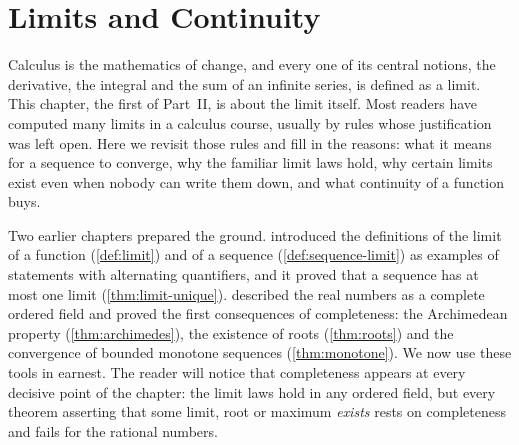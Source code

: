 \chapter{Limits and Continuity}
\label{ch:limits}


Calculus is the mathematics of change, and every one of its central notions, the derivative, the integral and the sum of an infinite series, is defined as a limit. This chapter, the first of Part~II, is about the limit itself. Most readers have computed many limits in a calculus course, usually by rules whose justification was left open. Here we revisit those rules and fill in the reasons: what it means for a sequence to converge, why the familiar limit laws hold, why certain limits exist even when nobody can write them down, and what continuity of a function buys.

Two earlier chapters prepared the ground.  introduced the definitions of the limit of a function (\cref{def:limit}) and of a sequence (\cref{def:sequence-limit}) as examples of statements with alternating quantifiers, and it proved that a sequence has at most one limit (\cref{thm:limit-unique}).  described the real numbers as a complete ordered field and proved the first consequences of completeness: the Archimedean property (\cref{thm:archimedes}), the existence of roots (\cref{thm:roots}) and the convergence of bounded monotone sequences (\cref{thm:monotone}). We now use these tools in earnest. The reader will notice that completeness appears at every decisive point of the chapter: the limit laws hold in any ordered field, but every theorem asserting that some limit, root or maximum \emph{exists} rests on completeness and fails for the rational numbers.

